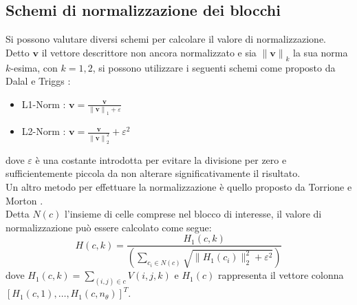 \subsection{Schemi di normalizzazione dei blocchi}
Si possono valutare diversi schemi per calcolare il valore di normalizzazione. \\
Detto $\textbf{v}$ il vettore descrittore non ancora normalizzato e sia ${\|\textbf{v}\|}_{k}$ la sua norma $k$-esima, con $k=1,2$, si possono utilizzare i seguenti schemi come proposto da Dalal e Triggs \citep{Art_HOGHuman}:
\begin{itemize}
\item L1-Norm : $\textbf{v} =\frac{\textbf{v}}{{\|\textbf{v}\|}_{1}+\varepsilon} $
\item L2-Norm :  $\textbf{v} =\frac{\textbf{v}}{{\|\textbf{v}\|}_{2}^2}+{\varepsilon}^2 $
\end{itemize}
dove $\varepsilon$ è una costante introdotta per evitare la divisione per zero e sufficientemente piccola da non alterare significativamente il risultato.
\\
Un altro metodo per effettuare la normalizzazione è quello proposto da Torrione e Morton \citep{Art_HOGLandmine}. \\
Detta $N(c)$ l'insieme di celle comprese nel blocco di interesse, il valore di normalizzazione può essere calcolato come segue:
\begin{equation}
\label{eq:normalizzazione}
H(c,k)= \frac{H_{1}(c,k)}{\left ( \sum_{c_i\in N(c)} \sqrt{\|H_{1}(c_i)\|^2_2+\varepsilon^2}\right )}
\end{equation}
dove $H_1(c,k)=\sum_{(i,j)\in c}V(i,j,k)$ e $H_1(c)$ rappresenta il vettore colonna\\
 $[H_1(c,1),\ldots, H_1(c,n_{\theta}) ]^T$.
 
